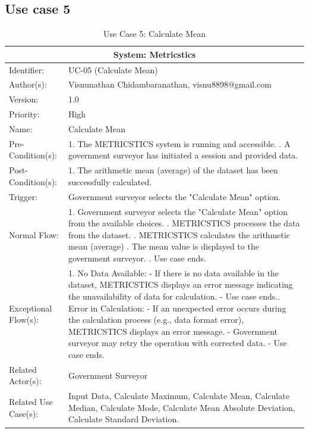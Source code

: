 
\begin{table}[h]
\subsection*{Use case 5}
\begin{tabular}{ | p{4cm} | p{10cm} | }
 \hline
 \multicolumn{2}{|c|}{System: Metricstics} \\
 \hline
 Identifier: & UC-05 (Calculate Mean) \\
 \hline
 Author(s): & Visnunathan Chidambaranathan, visnu8898@gmail.com    \\
 \hline
 Version: & 1.0	\\
 \hline
 Priority: & High	\\
 \hline
 Name: & Calculate Mean  \\
 \hline
 Pre-Condition(s):  & {1. The METRICSTICS system is running and accessible. \newline 2. A government surveyor has initiated a session and provided data.  }\\
 \hline
 Post-Condition(s):  & {1. The arithmetic mean (average) of the dataset has been successfully calculated. }\\
 \hline
 Trigger: & Government surveyor selects the "Calculate Mean" option. \\
 \hline
 Normal Flow:  & {1. Government surveyor selects the "Calculate Mean" option from the available choices. \newline 2. METRICSTICS processes the data from the dataset. \newline 3. METRICSTICS calculates the arithmetic mean (average) \newline 4. The mean value is displayed to the government surveyor. \newline 5. Use case ends.}\\
 \hline
 Exceptional Flow(s):  & {1. No Data Available: \newline
   - If there is no data available in the dataset, METRICSTICS displays an error message indicating the unavailability of data for calculation.\newline
   - Use case ends.\newline
   2. Error in Calculation: \newline
   - If an unexpected error occurs during the calculation process (e.g., data format error), METRICSTICS displays an error message. \newline
   - Government surveyor may retry the operation with corrected data. \newline
   - Use case ends.}\\
 \hline
 Related Actor(s): & Government Surveyor\\
 \hline
 Related Use Case(s): & Input Data, Calculate Maximum, Calculate Mean, Calculate Median, Calculate Mode, Calculate Mean Absolute Deviation, Calculate Standard Deviation.\\
 \hline
 \end{tabular}
\renewcommand{\thetable}{\arabic{table}}
\caption{Use Case 5: Calculate Mean}
\label{tab:table1}
\end{table}

